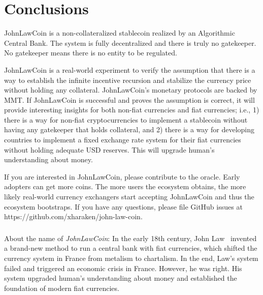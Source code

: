 \documentclass[dvipdfmx,a4paper]{article}
\begin{document}
\section{Conclusions}

JohnLawCoin is a non-collateralized stablecoin realized by an Algorithmic Central Bank. The system is fully decentralized and there is truly no gatekeeper. No gatekeeper means there is no entity to be regulated.

JohnLawCoin is a real-world experiment to verify the assumption that there is a way to establish the infinite incentive recursion and stabilize the currency price without holding any collateral. JohnLawCoin's monetary protocols are backed by MMT. If JohnLawCoin is successful and proves the assumption is correct, it will provide interesting insights for both non-fiat currencies and fiat currencies; i.e., 1) there is a way for non-fiat cryptocurrencies to implement a stablecoin without having any gatekeeper that holds collateral, and 2) there is a way for developing countries to implement a fixed exchange rate system for their fiat currencies without holding adequate USD reserves. This will upgrade human's understanding about money.

If you are interested in JohnLawCoin, please contribute to the oracle. Early adopters can get more coins. The more users the ecosystem obtains, the more likely real-world currency exchangers start accepting JohnLawCoin and thus the ecosystem bootstraps. If you have any questions, please file GitHub issues at https://github.com/xharaken/john-law-coin.

\subsubsection*{}

About the name of \textit{JohnLawCoin}: In the early 18th century, John Law~\cite{davies2010history,ferguson2008ascent,iwai1997evolution} invented a brand-new method to run a central bank with fiat currencies, which shifted the currency system in France from metalism to chartalism. In the end, Law's system failed and triggered an economic crisis in France. However, he was right. His system upgraded human's understanding about money and established the foundation of modern fiat currencies.



\end{document}
